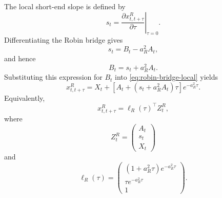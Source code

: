 \documentclass[11pt]{article}
\numberwithin{equation}{section}
\begin{document}
The local short-end slope is defined by
\begin{equation}
\label{eq:s-def-robin-local}
        s_t
        =
        \left.
        \frac{\partial x^R_{t,t+\tau}}{\partial \tau}
        \right|_{\tau=0}.
\end{equation}
Differentiating the Robin bridge gives
\begin{equation}
\label{eq:s-B-A-relation}
        s_t=B_t-a_R^2A_t,
\end{equation}
and hence
\begin{equation}
\label{eq:B-s-A-relation}
        B_t=s_t+a_R^2A_t.
\end{equation}
Substituting this expression for \(B_t\) into \eqref{eq:robin-bridge-local} yields
\begin{equation}
\label{eq:robin-bridge-slope-form}
        x^R_{t,t+\tau}
        =
        X_t+
        \left[
        A_t+\left(s_t+a_R^2A_t\right)\tau
        \right]e^{-a_R^2\tau}.
\end{equation}
Equivalently,
\begin{equation}
\label{eq:robin-projection-form}
        x^R_{t,t+\tau}
        =
        \ell_R(\tau)^\top Z^R_t,
\end{equation}
where
\begin{equation}
\label{eq:ZR-robin-local}
        Z^R_t=
        \begin{pmatrix}
        A_t\\
        s_t\\
        X_t
        \end{pmatrix}
\end{equation}
and
\begin{equation}
\label{eq:ellR-robin-local}
        \ell_R(\tau)
        =
        \begin{pmatrix}
        (1+a_R^2\tau)e^{-a_R^2\tau}\\
        \tau e^{-a_R^2\tau}\\
        1
        \end{pmatrix}.
\end{equation}
\end{document}
